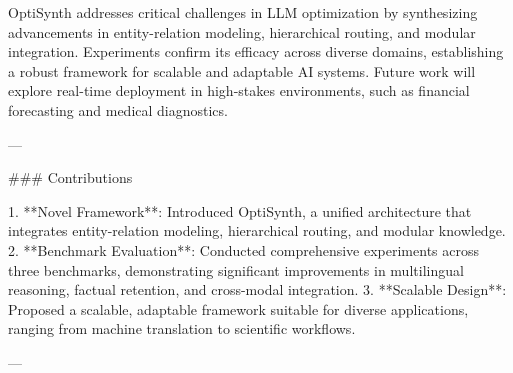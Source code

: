 OptiSynth addresses critical challenges in LLM optimization by synthesizing advancements in entity-relation modeling, hierarchical routing, and modular integration. Experiments confirm its efficacy across diverse domains, establishing a robust framework for scalable and adaptable AI systems. Future work will explore real-time deployment in high-stakes environments, such as financial forecasting and medical diagnostics.

---

### Contributions

1. **Novel Framework**: Introduced OptiSynth, a unified architecture that integrates entity-relation modeling, hierarchical routing, and modular knowledge.
2. **Benchmark Evaluation**: Conducted comprehensive experiments across three benchmarks, demonstrating significant improvements in multilingual reasoning, factual retention, and cross-modal integration.
3. **Scalable Design**: Proposed a scalable, adaptable framework suitable for diverse applications, ranging from machine translation to scientific workflows.

---